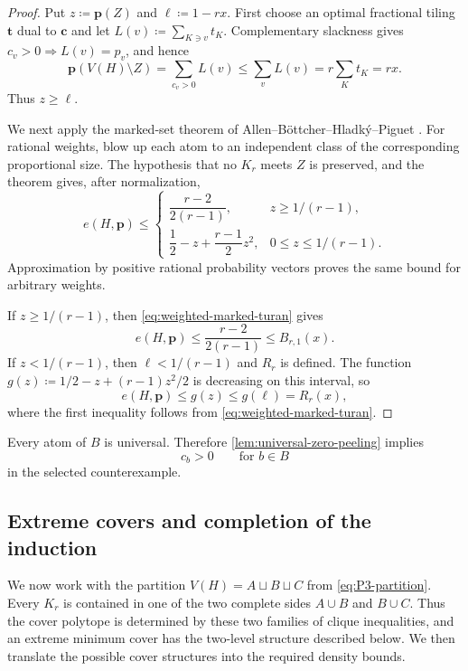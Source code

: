 \documentclass[10pt]{article}
\numberwithin{equation}{section}
\newcommand{\vct}[1]{\boldsymbol{#1}}
\begin{document}
\begin{proof}
Put $z\coloneqq\vct p(Z)$ and $\ell\coloneqq1-rx$.  First choose an optimal fractional tiling $\vct t$ dual to $\vct c$ and let $L(v)\coloneqq\sum_{K\ni v}t_K$.  Complementary slackness gives $c_v>0\Rightarrow L(v)=p_v$, and hence
\[
 \vct p(V(H)\setminus Z)
 =\sum_{c_v>0}L(v)
 \le\sum_vL(v)=r\sum_Kt_K=rx.
\]
Thus $z\ge\ell$.

We next apply the marked-set theorem of Allen--B\"ottcher--Hladk\'y--Piguet \cite[Theorem~2(a)]{ABHP14}.  For rational weights, blow up each atom to an independent class of the corresponding proportional size.  The hypothesis that no $K_r$ meets $Z$ is preserved, and the theorem gives, after normalization,
\begin{equation}\label{eq:weighted-marked-turan}
 e(H,\vct p)\le
 \begin{cases}
 \dfrac{r-2}{2(r-1)},&z\ge1/(r-1),\\[1ex]
 \dfrac12-z+\dfrac{r-1}{2}z^2,&0\le z\le1/(r-1).
 \end{cases}
\end{equation}
Approximation by positive rational probability vectors proves the same bound for arbitrary weights.

If $z\ge1/(r-1)$, then \cref{eq:weighted-marked-turan} gives
\[
 e(H,\vct p)\le\frac{r-2}{2(r-1)}\le B_{r,1}(x).
\]
If $z<1/(r-1)$, then $\ell<1/(r-1)$ and $R_r$ is defined.  The function $g(z)\coloneqq1/2-z+(r-1)z^2/2$ is decreasing on this interval, so
\[
 e(H,\vct p)\le g(z)\le g(\ell)=R_r(x),
\]
where the first inequality follows from \cref{eq:weighted-marked-turan}.
\end{proof}

Every atom of $B$ is universal.  Therefore \cref{lem:universal-zero-peeling} implies
\begin{equation}\label{eq:B-cover-positive}
 c_b>0\qquad\text{for }b\in B
\end{equation}
in the selected counterexample.

\subsection{Extreme covers and completion of the induction}\label{sec:extreme-cover}

We now work with the partition $V(H)=A\sqcup B\sqcup C$ from \cref{eq:P3-partition}.  Every $K_r$ is contained in one of the two complete sides $A\cup B$ and $B\cup C$.  Thus the cover polytope is determined by these two families of clique inequalities, and an extreme minimum cover has the two-level structure described below.  We then translate the possible cover structures into the required density bounds.
\end{document}
